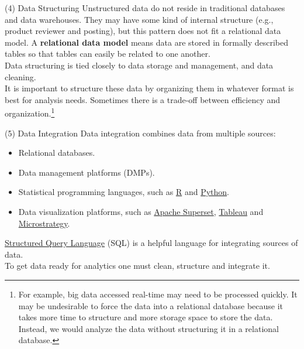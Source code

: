 \documentclass[pdf]{beamer}
\newcommand{\empr}[1]{{\color{franklinblue}\textbf{#1}}}
\theoremstyle{remark}
\theoremstyle{definition}
\begin{document}
\begin{frame}[t]{(4) Data Structuring}
Unstructured data do not reside in traditional databases and data warehouses. They may have some kind of internal structure (e.g., product reviewer and posting), but this pattern does not fit a relational data model. A \empr{relational data model} means data are stored in formally described tables so that tables can easily be related to one another.\\
\vspace{1.5ex} 
Data structuring is tied closely to data storage and management, and data cleaning. \\
\vspace{1.5ex} 
It is important to structure these data by organizing them in whatever format is best for analysis needs. Sometimes there is a trade-off between efficiency and organization.\footnote{For example, big data accessed real-time may need to be processed quickly. It may be undesirable to force the data into a relational database because it takes more time to structure and more storage space to store the data. Instead, we would analyze the data without structuring it in a relational database.}
\end{frame}

\begin{frame}[t]{(5) Data Integration}
Data integration combines data from multiple sources:
\begin{itemize}
\item Relational databases.
\item Data management platforms (DMPs).
\item Statistical programming languages, such as \href{https://cran.r-project.org/}{R} and \href{https://www.python.org/}{Python}.  
\item  Data visualization platforms, such as \href{https://superset.apache.org/}{Apache Superset}, \href{https://www.tableau.com/}{Tableau} and \href{https://www.microstrategy.com/en}{Microstrategy}.
\end{itemize}
\href{https://www.w3schools.com/sql/sql_intro.asp}{Structured Query Language} (SQL) is a helpful language for integrating sources of data. \\
\vspace{1.5ex}
To get data ready for analytics one must clean, structure and integrate it.
\end{frame}
\end{document}
